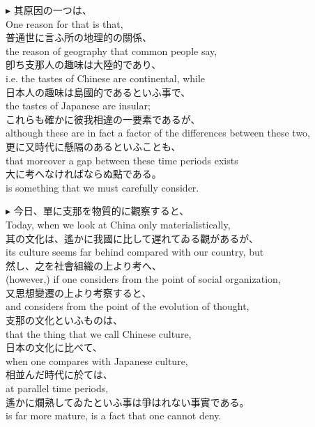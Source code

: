 \documentclass{ctexart}
\makeatletter
\newcommand*{\shifttext}[1]{%
  \settowidth{\@tempdima}{#1}%
  \hspace{-\@tempdima}#1%
}
\newcommand{\plabel}[1]{%
\shifttext{\textbf{#1}\quad}%
}
\newcommand{\prule}{%
\begin{center}%
\hdashrule[0.5ex]{.99\linewidth}{1pt}{1pt 2.5pt}%
\end{center}%
}
\makeatother
\begin{document}
\vspace{1em}
\plabel{$\blacktriangleright$}%
其原因の一つは、\\
One reason for that is that,\\
普通世に言ふ所の地理的の關係、\\
the reason of geography that common people say,\\
卽ち支那人の趣味は大陸的であり、\\
i.e. the tastes of Chinese are continental, while\\
日本人の趣味は島國的であるといふ事で、\\
the tastes of Japanese are insular;\\
これらも確かに彼我相違の一要素であるが、\\
although these are in fact a factor of the differences between these two,\\
更に又時代に懸隔のあるといふことも、\\
that moreover a gap between these time periods exists\\
大に考へなければならぬ點である。\\
is something that we must carefully consider.

\prule
\plabel{$\blacktriangleright$}%
今日、單に支那を物質的に觀察すると、\\
Today, when we look at China only materialistically,\\
其の文化は、遙かに我國に比して遅れてゐる觀があるが、\\
its culture seems far behind compared with our country, but\\
然し、之を社會組織の上より考へ、\\
(however,) if one considers from the point of social organization,\\
又思想變遷の上より考察すると、\\
and considers from the point of the evolution of thought,\\
支那の文化といふものは、\\
that the thing that we call Chinese culture,\\
日本の文化に比べて、\\
when one compares with Japanese culture,\\
相並んだ時代に於ては、\\
at parallel time periods,\\
遙かに爛熟してゐたといふ事は爭はれない事實である。\\
is far more mature, is a fact that one cannot deny.
\end{document}
